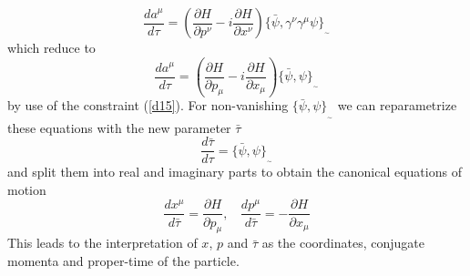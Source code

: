 \documentclass[a4paper,a4paper]{article}
\begin{document}
\begin{equation} 
\frac{da^{\mu }}{d\tau} = \left(\frac{\partial H}{\partial p^{\nu  }} - i
\frac{\partial H}{\partial x^{\nu  }}\right) \{\bar{\psi },\gamma^{\nu }
\gamma^{\mu }\psi  \}_{_{\sim }} 
\label{d3}
\end{equation}
which reduce to 
\begin{equation} 
\frac{da^{\mu }}{d\tau} = \left(\frac{\partial H}{\partial p_{\mu }  } - i
\frac{\partial H}{\partial x_{\mu   }}\right) \{\bar{\psi },\psi  \}_{_{\sim }} 
\label{d9}
\end{equation}
by use of the constraint (\ref{d15}). For non-vanishing $\{\bar{\psi },\psi
\}_{_{\sim }}$ we can reparametrize these equations with the new parameter
$\bar{\tau }$
\begin{equation} 
\frac{d\bar{\tau }}{d\tau } = \{\bar{\psi },\psi  \}_{_{\sim }} 
\label{d10}
\end{equation}
and split them into real and imaginary parts to obtain the canonical equations
of motion
\begin{equation} 
\frac{dx^{\mu }}{d\bar{\tau}}=\frac{\partial H}{\partial p_{\mu   }} , \ \ \ \
\frac{dp^{\mu }}{d\bar{\tau}}= -\frac{\partial H}{\partial x_{\mu  }}
\label{d11}
\end{equation}
This leads to the interpretation of $x$, $p$ and $\bar{\tau }$ as the
coordinates, conjugate momenta and proper-time of the particle. 
\end{document}
